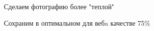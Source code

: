 Сделаем фотографию более "теплой"

\noindent
\begin{minipage}{\linewidth}
\end{minipage}
\bigskip

Сохраним в оптимальном для вебa качестве 75\%

\noindent
\begin{minipage}{\linewidth}
\end{minipage}
\bigskip

